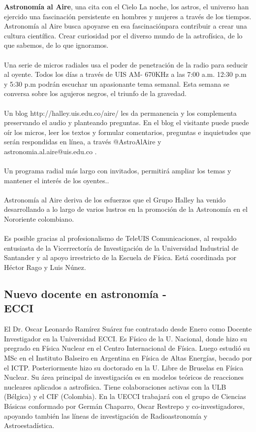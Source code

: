 \documentclass{book}
\begin{document}
\textbf{Astronomía al Aire}, una cita con el Cielo La noche, los astros, el universo han ejercido una fascinación persistente en hombres y mujeres a través de los tiempos. Astronomía al Aire busca apoyarse en esa fascinaciónpara contribuir a crear una cultura científica. Crear curiosidad por el diverso mundo de la astrofísica, de lo que sabemos, de lo que ignoramos.\\
\\
Una serie de micros radiales usa el poder de penetración de la radio para seducir al oyente.  Todos los días a través de  UIS AM- 670KHz a las 7:00 a.m. 12:30 p.m y 5:30 p.m podrán escuchar un apasionante tema semanal. Esta semana se conversa sobre los agujeros negros, el triunfo de la gravedad.\\
\\
Un blog http://halley.uis.edu.co/aire/ les da permanencia y los complementa preservando el audio y planteando preguntas.  En el blog el visitante puede puede oír los micros, leer los textos y formular comentarios, preguntas e inquietudes que serán respondidas en línea, a través @AstroAlAire y astronomia.al.aire@uis.edu.co .\\
\\
Un programa radial más largo con invitados, permitirá ampliar los temas y mantener el interés de los oyentes..\\
\\
Astronomía al Aire deriva de los esfuerzos que el Grupo Halley ha venido desarrollando a lo largo de varios lustros en la promoción de la Astronomía en el Nororiente colombiano.\\
\\
Es posible gracias al profesionalismo de TeleUIS Comunicaciones, al respaldo entusiasta de la Vicerrectoría de Investigación de la Universidad Industrial de Santander y al apoyo irrestricto de la Escuela de Física. Está coordinada por Héctor Rago y Luis Núnez.



\subsection{Nuevo docente en astronomía -\\ ECCI}

El Dr. Oscar Leonardo Ramírez Suárez fue contratado desde Enero como Docente Investigador en la Universidad ECCI. Es Físico de la U. Nacional, donde hizo su pregrado en Física Nuclear en el Centro Internacional de Física. Luego estudió su MSc en el Instituto Balseiro en Argentina en Física de Altas Energías, becado por el ICTP. Posteriormente hizo su doctorado en la U. Libre de Bruselas en Física Nuclear. Su área principal de investigación es en modelos teóricos de reacciones nucleares aplicados a astrofísica. Tiene colaboraciones activas con la ULB (Bélgica) y el CIF (Colombia). En la UECCI trabajará con el grupo de Ciencias Básicas conformado por Germán Chaparro, Oscar Restrepo y co-investigadores, apoyando también las líneas de investigación de Radioastronomía y Astroestadística.
\end{document}
